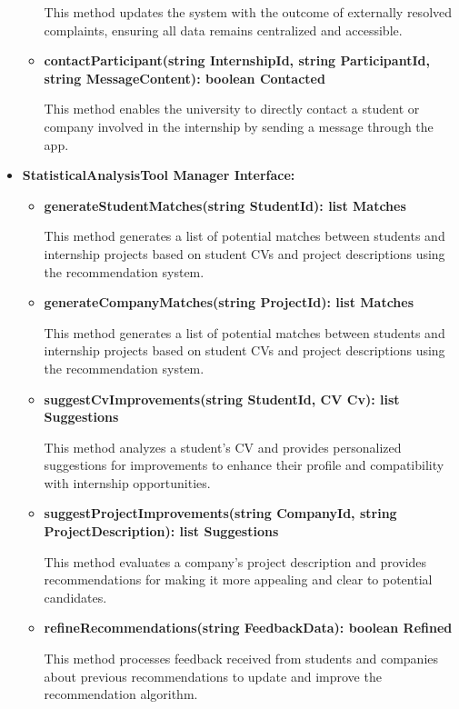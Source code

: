\begin{itemize}
\begin{itemize}
    This method updates the system with the outcome of externally resolved complaints, ensuring all data remains centralized and accessible.

    \item \textbf{contactParticipant(string InternshipId, string ParticipantId, string MessageContent): boolean Contacted}

    This method enables the university to directly contact a student or company involved in the internship by sending a message through the app.

\end{itemize}

\item \textbf{StatisticalAnalysisTool Manager Interface:}
\begin{itemize}

    \item \textbf{generateStudentMatches(string StudentId): list Matches}

    This method generates a list of potential matches between students and internship projects based on student CVs and project descriptions using the recommendation system.

    \item \textbf{generateCompanyMatches(string ProjectId): list Matches}

    This method generates a list of potential matches between students and internship projects based on student CVs and project descriptions using the recommendation system.

    \item \textbf{suggestCvImprovements(string StudentId, CV Cv): list Suggestions}

    This method analyzes a student's CV and provides personalized suggestions for improvements to enhance their profile and compatibility with internship opportunities.

    \item \textbf{suggestProjectImprovements(string CompanyId, string ProjectDescription): list Suggestions}

    This method evaluates a company's project description and provides recommendations for making it more appealing and clear to potential candidates.

    \item \textbf{refineRecommendations(string FeedbackData): boolean Refined}

    This method processes feedback received from students and companies about previous recommendations to update and improve the recommendation algorithm.


\end{itemize}
\end{itemize}
